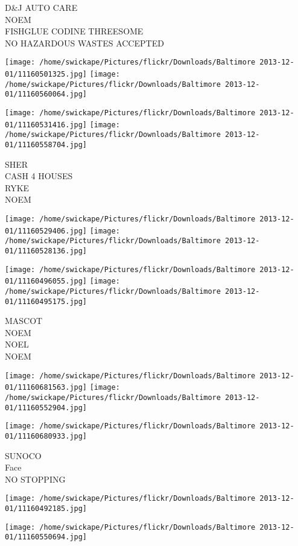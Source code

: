 \documentclass[10pt,letterpaper]{article}
\begin{document}
D\&J AUTO CARE\\
NOEM\\
FISHGLUE CODINE THREESOME\\
NO HAZARDOUS WASTES ACCEPTED
\pagebreak

\texttt{[image: /home/swickape/Pictures/flickr/Downloads/Baltimore 2013-12-01/11160501325.jpg]}
\texttt{[image: /home/swickape/Pictures/flickr/Downloads/Baltimore 2013-12-01/11160560064.jpg]}

\texttt{[image: /home/swickape/Pictures/flickr/Downloads/Baltimore 2013-12-01/11160531416.jpg]}
\texttt{[image: /home/swickape/Pictures/flickr/Downloads/Baltimore 2013-12-01/11160558704.jpg]}

SHER\\
CASH 4 HOUSES\\
RYKE\\
NOEM
\pagebreak

\texttt{[image: /home/swickape/Pictures/flickr/Downloads/Baltimore 2013-12-01/11160529406.jpg]}
\texttt{[image: /home/swickape/Pictures/flickr/Downloads/Baltimore 2013-12-01/11160528136.jpg]}

\texttt{[image: /home/swickape/Pictures/flickr/Downloads/Baltimore 2013-12-01/11160496055.jpg]}
\texttt{[image: /home/swickape/Pictures/flickr/Downloads/Baltimore 2013-12-01/11160495175.jpg]}

MASCOT\\
NOEM\\
NOEL\\
NOEM
\pagebreak

\texttt{[image: /home/swickape/Pictures/flickr/Downloads/Baltimore 2013-12-01/11160681563.jpg]}
\texttt{[image: /home/swickape/Pictures/flickr/Downloads/Baltimore 2013-12-01/11160552904.jpg]}

\texttt{[image: /home/swickape/Pictures/flickr/Downloads/Baltimore 2013-12-01/11160680933.jpg]}

SUNOCO\\
Face\\
NO STOPPING
\pagebreak

\texttt{[image: /home/swickape/Pictures/flickr/Downloads/Baltimore 2013-12-01/11160492185.jpg]}

\vspace{0.25in}
\texttt{[image: /home/swickape/Pictures/flickr/Downloads/Baltimore 2013-12-01/11160550694.jpg]}
\end{document}
